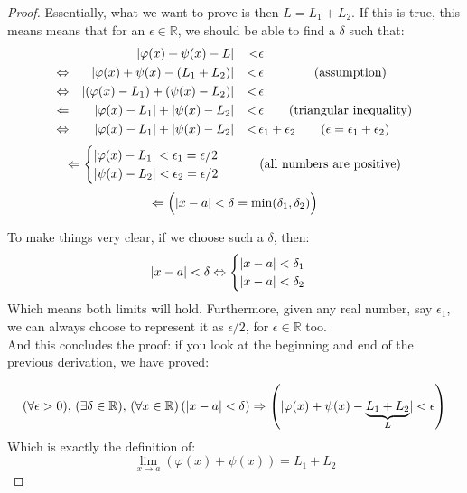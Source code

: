 \documentclass[solutions.tex]{subfiles}
\begin{document}
\begin{proof}
Essentially, what we want to prove is then $L = L_1 + L_2$. If this
is true, this means means that for an $\epsilon\in\mathbb{R}$, we
should be able to find a $\delta$ such that:
\begin{equation*} \begin{aligned}
	~ && \abs{\varphi(x)+\psi(x)-L} &&<& \epsilon \\
	\Leftrightarrow && \abs{\varphi(x)+\psi(x)-(L_1+L_2)} &&<\,& \epsilon
		\qquad\qquad\text{(assumption)} \\
	\Leftrightarrow && \abs{(\varphi(x)-L_1)+(\psi(x)-L_2)} &&<\,& \epsilon \\
	\Leftarrow && \abs{\varphi(x)-L_1}+\abs{\psi(x)-L_2} &&<\,& \epsilon
		\qquad\text{(triangular inequality)} \\
	\Leftrightarrow && \abs{\varphi(x)-L_1}+\abs{\psi(x)-L_2} &&<\,& \epsilon_1+\epsilon_2
		\qquad(\epsilon = \epsilon_1+\epsilon_2)
\end{aligned} \end{equation*}
\[
	\Leftarrow \begin{cases}
		\abs{\varphi(x)-L_1} < \epsilon_1 = \epsilon/2 \\
		\abs{\psi(x)-L_2} < \epsilon_2 = \epsilon/2
	\end{cases}\qquad\text{(all numbers are positive)}
\]
\[
	\Leftarrow\Bigl(\abs{x-a}<\delta=\min(\delta_1,\delta_2)\Bigr)
\]

To make things very clear, if we choose such a $\delta$, then:
\[
	\abs{x-a}<\delta \Leftrightarrow \begin{cases}
		\abs{x-a} < \delta_1 \\
		\abs{x-a} < \delta_2
	\end{cases}
\]
Which means both limits will hold. Furthermore, given any real
number, say $\epsilon_1$, we can always choose to represent it as
$\epsilon/2$, for $\epsilon\in\mathbb{R}$ too. \\


And this concludes the proof: if you look at the beginning and end of
the previous derivation, we have proved:

\[ \epsdelta{\epsilon}{\delta}{a}{x}{\varphi(x)+\psi(x)}{\underbrace{L_1+L_2}_L} \]
Which is exactly the definition of:
\[
	\lim_{x\rightarrow a}\left(\varphi(x)+\psi(x)\right) = L_1+L_2
\]
\end{proof}
\end{document}
